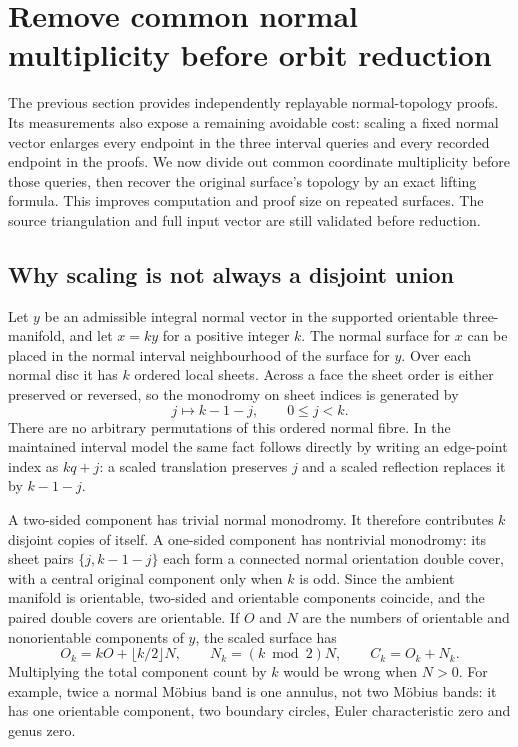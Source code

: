 \section{Remove common normal multiplicity before orbit reduction}
\label{sec:normal-multiplicity}

The previous section provides independently replayable normal-topology
proofs. Its measurements also expose a remaining avoidable cost: scaling a
fixed normal vector enlarges every endpoint in the three interval queries
and every recorded endpoint in the proofs. We now divide out common
coordinate multiplicity before those queries, then recover the original
surface's topology by an exact lifting formula. This improves computation
and proof size on repeated surfaces. The source triangulation and full
input vector are still validated before reduction.

\subsection{Why scaling is not always a disjoint union}

Let $y$ be an admissible integral normal vector in the supported orientable
three-manifold, and let $x=ky$ for a positive integer $k$. The normal
surface for $x$ can be placed in the normal interval neighbourhood of the
surface for $y$. Over each normal disc it has $k$ ordered local sheets.
Across a face the sheet order is either preserved or reversed, so the
monodromy on sheet indices is generated by
\[
 j\longmapsto k-1-j,\qquad 0\le j<k.
\]
There are no arbitrary permutations of this ordered normal fibre.
In the maintained interval model the same fact follows directly by writing
an edge-point index as $kq+j$: a scaled translation preserves $j$ and a
scaled reflection replaces it by $k-1-j$.

A two-sided component has trivial normal monodromy. It therefore contributes
$k$ disjoint copies of itself. A one-sided component has nontrivial
monodromy: its sheet pairs $\{j,k-1-j\}$ each form a connected normal
orientation double cover, with a central original component only when
$k$ is odd. Since the ambient manifold is orientable, two-sided and
orientable components coincide, and the paired double covers are
orientable. If $O$ and $N$ are the numbers of orientable and nonorientable
components of $y$, the scaled surface has
\[
 O_k=kO+\lfloor k/2\rfloor N,\qquad
 N_k=(k\bmod2)N,\qquad C_k=O_k+N_k.
\]
Multiplying the total component count by $k$ would be wrong when $N>0$.
For example, twice a normal M\"obius band is one annulus, not two
M\"obius bands: it has one orientable component, two boundary circles,
Euler characteristic zero and genus zero.

